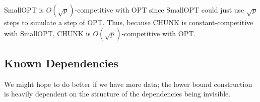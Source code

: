SmallOPT is $O(\sqrt{p})$-competitive with OPT since SmallOPT
could just use $\sqrt{p}$ steps to simulate a step of OPT. Thus,
because CHUNK is constant-competitive with SmallOPT, CHUNK is
$O(\sqrt{p})$-competitive with OPT. 

\subsection{Known Dependencies}
We might hope to do better if we have more data; the lower bound
construction is heavily dependent on the structure of the
dependencies being invisible.


